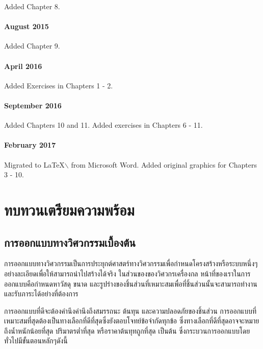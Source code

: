 \documentclass[a4paper,openany,12pt]{book}
\begin{document}
Added Chapter 8.

\subsection*{August 2015}
\label{sec:orga629057}

Added Chapter 9.

\subsection*{April 2016}
\label{sec:orgdc6a4a7}

Added Exercises in Chapters 1 - 2.

\subsection*{September 2016}
\label{sec:orga27b515}

Added Chapters 10 and 11. Added exercises in Chapters 6 - 11.

\subsection*{February 2017}
\label{sec:orgb834d00}

Migrated to \LaTeX$\backslash$ from Microsoft Word. Added original graphics for
Chapters 3 - 10.


\tableofcontents
\listoffigures
\listoftables
\part{ทบทวนเตรียมความพร้อม}
\label{the-preparations}
\chapter{การออกแบบทางวิศวกรรมเบื้องต้น}
\label{introduction-to-engineering-design}
การออกแบบทางวิศวกรรมเป็นการประยุกต์ศาสตร์ทางวิศวกรรมเพื่อกำหนดโครงสร้างหรือระบบหนึ่งๆอย่างละเอียดเพื่อให้สามารถนำไปสร้างได้จริง ในส่วนของของวิศวกรเครื่องกล หน้าที่ของเราในการออกแบบคือกำหนดหาวัสดุ ขนาด และรูปร่างของชิ้นส่วนที่เหมาะสมเพื่อที่ชิ้นส่วนนั้นจะสามารถทำงานและรับภาระได้อย่างที่ต้องการ

การออกแบบที่ดีจะต้องคำนึงคำนึงถึงสมรรถนะ ต้นทุน และความปลอดภัยของชิ้นส่วน การออกแบบที่เหมาะสมที่สุดต้องเป็นทางเลือกที่ดีที่สุดซึ่งยังตอบโจทย์ข้อจำกัดทุกข้อ ซึ่งทางเลือกที่ดีที่สุดอาจจะหมายถึงน้ำหนักน้อยที่สุด ปริมาตรต่ำที่สุด หรือราคาต้นทุทถูกที่สุด เป็นต้น ซึ่งกระบวนการออกแบบโดยทั่วไปมีขั้นตอนหลักๆดังนี้
\end{document}
